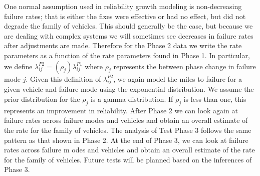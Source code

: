 \documentclass[12pt]{article}
\begin{document}
One normal assumption used in reliability growth modeling is non-decreasing
failure rates; that is either the fixes were effective or had no effect, but did
not degrade the family of vehicles.  This should generally be the case, but
because we are dealing with complex systems we will sometimes see decreases in
failure rates after adjustments are made.  Therefore for the Phase 2 data we
write the rate parameters as a function of the rate parameters found in Phase 1.
In particular, we define $\lambda_{ij}^{P2}=(\rho_{j})\lambda_{ij}^{P1}$ where
$\rho_{j}$ represents the between phase change in failure mode $j$. Given this
definition of $\lambda_{ij}^{P2}$, we again model the miles to failure for a given
vehicle and failure mode using the exponential distribution. We assume the prior
distribution for the $\rho_{j}$ is a gamma distribution.  If $\rho_{j}$ is less
than one, this represents an improvement in reliability.  After Phase 2 we can
look again at failure rates across failure modes and vehicles and obtain an
overall estimate of the rate for the family of vehicles.  The analysis of Test
Phase 3 follows the same pattern as that shown in Phase 2. At the end of
Phase 3, we can look at failure rates across failure m odes and vehicles and
obtain an overall estimate of the rate for the family of vehicles.
Future tests will be planned based on the inferences of Phase 3.
\end{document}
